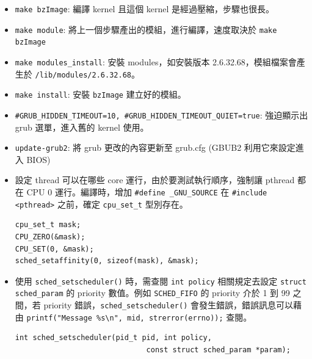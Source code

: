 \documentclass{res}
\begin{document}
\begin{resume}
\begin{itemize}
	\item \lstinline{make bzImage}: 編譯 kernel 且這個 kernel 是經過壓縮，步驟也很長。
	
	\item \lstinline{make module}: 將上一個步驟產出的模組，進行編譯，速度取決於 \lstinline{make bzImage}
	
	\item \lstinline{make modules_install}: 安裝 modules，如安裝版本 2.6.32.68，模組檔案會產生於 \lstinline{/lib/modules/2.6.32.68}。
	
	\item \lstinline{make install}: 安裝 \lstinline{bzImage} 建立好的模組。
	
	\item  \lstinline{#GRUB_HIDDEN_TIMEOUT=10, #GRUB_HIDDEN_TIMEOUT_QUIET=true}: 強迫顯示出 grub 選單，進入舊的 kernel 使用。
	
	\item \lstinline{update-grub2}: 將 grub 更改的內容更新至 grub.cfg (GBUB2 利用它來設定進入 BIOS)
\end{itemize}

\vspace*{.1in} 

\hspace*{.1in} 

\begin{itemize}
	\item 設定 thread 可以在哪些 core 運行，由於要測試執行順序，強制讓 pthread 都在 CPU 0 運行。編譯時，增加 \lstinline{#define _GNU_SOURCE} 在 \lstinline{#include <pthread>} 之前，確定 \lstinline{cpu_set_t} 型別存在。
	
\begin{lstlisting}[frame=single]
cpu_set_t mask;
CPU_ZERO(&mask);
CPU_SET(0, &mask);
sched_setaffinity(0, sizeof(mask), &mask);
\end{lstlisting}

	\item 使用 \lstinline{sched_setscheduler()} 時，需查閱 \lstinline{int policy} 相關規定去設定 \lstinline{struct sched_param} 的 priority 數值。例如 \lstinline{SCHED_FIFO} 的 priority 介於 1 到 99 之間，若 priority 錯誤，\lstinline{sched_setscheduler()} 會發生錯誤，錯誤訊息可以藉由 \lstinline{printf("Message %s\n", mid, strerror(errno));} 查閱。

\begin{lstlisting}[frame=single]
int sched_setscheduler(pid_t pid, int policy,
                              const struct sched_param *param);
\end{lstlisting}


\end{itemize}
\end{resume}
\end{document}
